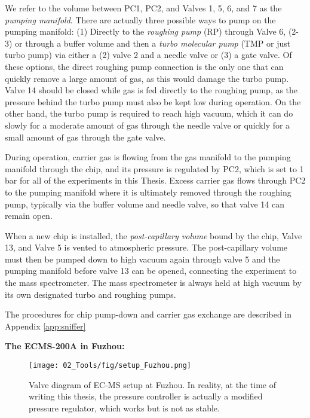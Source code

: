 We refer to the volume between PC1, PC2, and Valves 1, 5, 6, and 7 as the \textit{pumping manifold}. There are actually three possible ways to pump on the pumping manifold: (1) Directly to the \textit{roughing pump} (RP) through Valve 6, (2-3) or through a buffer volume and then a \textit{turbo molecular pump} (TMP or just turbo pump) via either a (2) valve 2 and a needle valve or (3) a gate valve. Of these options, the direct roughing pump connection is the only one that can quickly remove a large amount of gas, as this would damage the turbo pump. Valve 14 should be closed while gas is fed directly to the roughing pump, as the pressure behind the turbo pump must also be kept low during operation. On the other hand, the turbo pump is required to reach high vacuum, which it can do slowly for a moderate amount of gas through the needle valve or quickly for a small amount of gas through the gate valve.

During operation, carrier gas is flowing from the gas manifold to the pumping manifold through the chip, and its pressure is regulated by PC2, which is set to 1 bar for all of the experiments in this Thesis. Excess carrier gas flows through PC2 to the pumping manifold where it is ultimately removed through the roughing pump, typically via the buffer volume and needle valve, so that valve 14 can remain open.

When a new chip is installed, the \textit{post-capillary volume} bound by the chip, Valve 13, and Valve 5 is vented to atmospheric pressure. The post-capillary volume must then be pumped down to high vacuum again through valve 5 and the pumping manifold before valve 13 can be opened, connecting the experiment to the mass spectrometer. The mass spectrometer is always held at high vacuum by its own designated turbo and roughing pumps.

The procedures for chip pump-down and carrier gas exchange are described in Appendix \ref{app:sniffer}

\vspace{1cm}
\textbf{\large The ECMS-200A in Fuzhou:}

\begin{figure}[h!]
	\centering
	\texttt{[image: 02\_Tools/fig/setup\_Fuzhou.png]}
	\caption{Valve diagram of EC-MS setup at Fuzhou. In reality, at the time of writing this thesis, the pressure controller is actually a modified pressure regulator, which works but is not as stable.}
	\label{fig:Fuzhou}
\end{figure}

